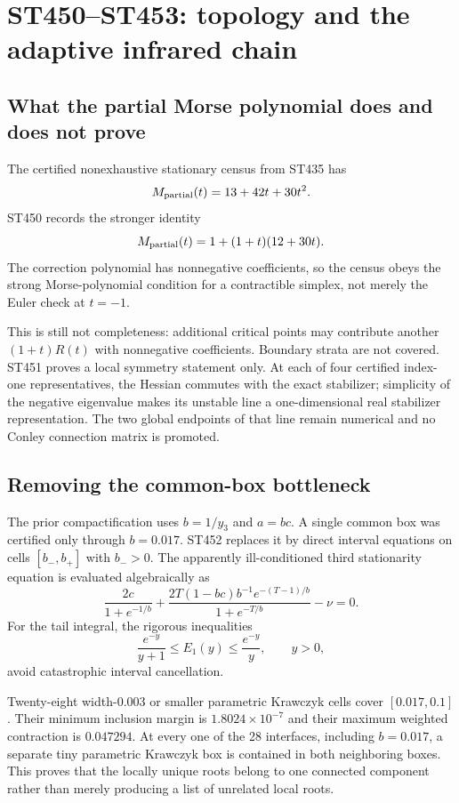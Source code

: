 \documentclass[11pt,a4paper]{article}
\begin{document}
\section{ST450--ST453: topology and the adaptive infrared chain}

\subsection{What the partial Morse polynomial does and does not prove}

The certified nonexhaustive stationary census from ST435 has
\[
 M_{\rm partial}(t)=13+42t+30t^2.
\]
ST450 records the stronger identity
\begin{equation}\label{eq:Morse}
 M_{\rm partial}(t)=1+(1+t)(12+30t).
\end{equation}
The correction polynomial has nonnegative coefficients, so the census obeys
the strong Morse-polynomial condition for a contractible simplex, not merely
the Euler check at $t=-1$.

This is still not completeness: additional critical points may contribute
another $(1+t)R(t)$ with nonnegative coefficients.  Boundary strata are not
covered.  ST451 proves a local symmetry statement only.  At each of four
certified index-one representatives, the Hessian commutes with the exact
stabilizer; simplicity of the negative eigenvalue makes its unstable line a
one-dimensional real stabilizer representation.  The two global endpoints of
that line remain numerical and no Conley connection matrix is promoted.

\subsection{Removing the common-box bottleneck}

The prior compactification uses $b=1/y_3$ and $a=bc$.  A single common box was
certified only through $b=0.017$.  ST452 replaces it by direct interval
equations on cells $[b_-,b_+]$ with $b_->0$.  The apparently ill-conditioned
third stationarity equation is evaluated algebraically as
\[
 \frac{2c}{1+e^{-1/b}}+
 \frac{2T(1-bc)b^{-1}e^{-(T-1)/b}}{1+e^{-T/b}}-\nu=0.
\]
For the tail integral, the rigorous inequalities
\[
 \frac{e^{-y}}{y+1}\le E_1(y)\le\frac{e^{-y}}{y},\qquad y>0,
\]
avoid catastrophic interval cancellation.

Twenty-eight width-$0.003$ or smaller parametric Krawczyk cells cover
$[0.017,0.1]$.  Their minimum inclusion margin is
$1.8024\times10^{-7}$ and their maximum weighted contraction is $0.047294$.
At every one of the 28 interfaces, including $b=0.017$, a separate tiny
parametric Krawczyk box is contained in both neighboring boxes.  This proves
that the locally unique roots belong to one connected component rather than
merely producing a list of unrelated local roots.
\end{document}
